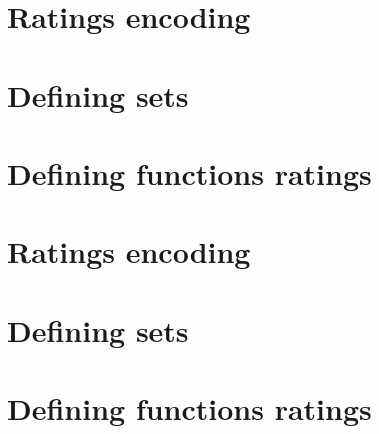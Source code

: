 
\section*{Ratings encoding}

\vfill
\section*{Defining sets}

\vfill
\section*{Defining functions ratings}

\vfill
\section*{Ratings encoding}

\vfill
\section*{Defining sets}

\vfill
\section*{Defining functions ratings}

\vfill

